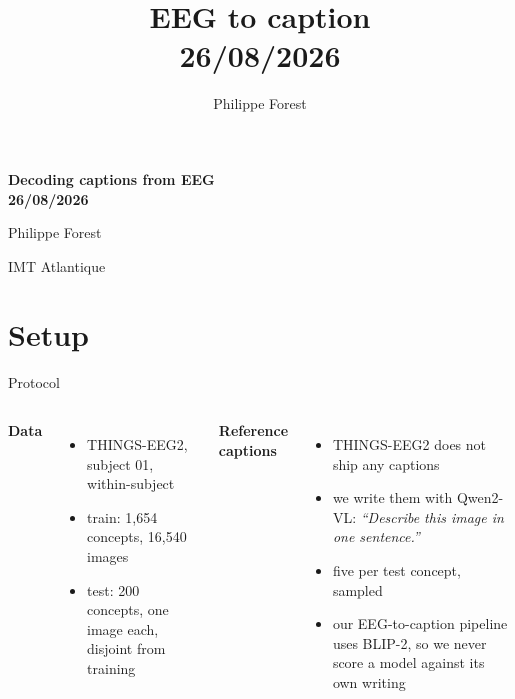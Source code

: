 \documentclass[aspectratio=169,10pt]{beamer}
\title{EEG to caption\\26/08/2026}
\author{Philippe Forest}
\institute{IMT Atlantique}
\date{}
\begin{document}
\begin{frame}[plain]
  \centering
  \vfill
  {\color{nbblue}\bfseries\fontsize{24}{28}\selectfont
    Decoding captions from EEG\\[0.2em]26/08/2026}

  \vspace{1.2em}
  {\large Philippe Forest}

  \vspace{0.25em}
  {\small IMT Atlantique}

  \vfill
\end{frame}

\section{Setup}

\begin{frame}{Protocol}
  \begin{columns}[T,onlytextwidth]
      \textbf{Data}
      \begin{itemize}
        \item THINGS-EEG2, subject 01, within-subject
        \item train: 1{,}654 concepts, 16{,}540 images
        \item test: 200 concepts, one image each,
              disjoint from training
      \end{itemize}

      \textbf{Reference captions}
      \begin{itemize}
        \item THINGS-EEG2 does not ship any captions
        \item we write them with Qwen2-VL:
              \textit{``Describe this image in one sentence.''}
        \item five per test concept, sampled
        \item our EEG-to-caption pipeline uses BLIP-2, so we never score
              a model against its own writing
      \end{itemize}
  \end{columns}

  \vspace{0.9em}
  \centering

\end{frame}
\end{document}
